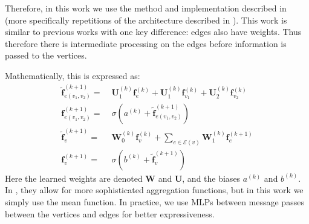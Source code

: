 \documentclass[10pt,twocolumn,letterpaper]{article}
\newcommand{\mat}[1]{\mathbf{#1}}
\begin{document}
Therefore, in this work we use the method and implementation described in \cite{battaglia2018relational} (more specifically repetitions of the architecture described in \cite{battaglia2016interaction}).
This work is similar to previous works with one key difference: edges also have weights.
Thus therefore there is intermediate processing on the edges before information is passed to the vertices. 

Mathematically, this is expressed as: %
\begin{align}
\mat{\tilde{f}}_{e(v_1,v_2)}^{(k+1)} =&\; \mat{U}_1^{(k)} \mat{f}_{e}^{(k)} + \mat{U}_1^{(k)} \mat{f}_{v_1}^{(k)} + \mat{U}_2^{(k)} \mat{f}_{v_2}^{(k)} \\
\mat{f}_{e(v_1,v_2)}^{(k+1)} =&\; \sigma \left(a^{(k)} + \mat{\tilde{f}}_{e(v_1,v_2)}^{(k+1)}\right) \\
\mat{\tilde{f}}_{v}^{(k+1)} =&\; \mat{W}_0^{(k)} \mat{f}_{v}^{(k)} + \sum_{e \in \mathcal{E}(v)} \mat{W}_1^{(k)} \mat{f}_{e}^{(k+1)} \\
\mat{f}_v^{(k+1)} =&\; \sigma\left(b^{(k)} + \mat{\tilde{f}}_v^{(k+1)}\right)
\end{align}
Here the learned weights are denoted $\mat{W}$ and $\mat{U}$, and the biases $a^{(k)}$ and  $b^{(k)}$.
In \cite{battaglia2018relational}, they allow for more sophisticated aggregation functions, but in this work we simply use the mean function.
In practice, we use MLPs between message passes between the vertices and edges for better expressiveness. 
\end{document}
